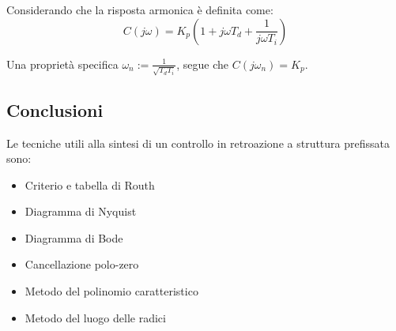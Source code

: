 Considerando che la risposta armonica è definita come:
\begin{equation}
  C(j\omega) = K_p(1 + j\omega T_d + \frac{1}{j\omega T_i})
\end{equation}

Una proprietà specifica $\omega_n := \frac{1}{\sqrt{T_d T_i}}$, segue che 
$C(j\omega_n) = K_p$.

%
%
%
%



\subsection{Conclusioni}
Le tecniche utili alla sintesi di un controllo in retroazione a struttura
prefissata sono:
\begin{itemize}
  \item Criterio e tabella di Routh
  \item Diagramma di Nyquist
  \item Diagramma di Bode
  \item Cancellazione polo-zero
  \item Metodo del polinomio caratteristico
  \item Metodo del luogo delle radici
\end{itemize}

